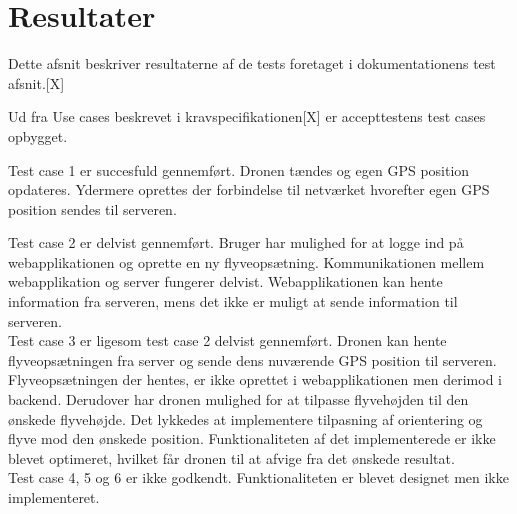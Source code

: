 \section{Resultater}

Dette afsnit beskriver resultaterne af de tests foretaget i dokumentationens test afsnit.[X]

Ud fra Use cases beskrevet i kravspecifikationen[X] er accepttestens test cases opbygget.

Test case 1 er succesfuld gennemført. Dronen tændes og egen GPS position opdateres. Ydermere oprettes der forbindelse til netværket hvorefter egen GPS position sendes til serveren.

Test case 2 er delvist gennemført. Bruger har mulighed for at logge ind på webapplikationen og oprette en ny flyveopsætning. Kommunikationen mellem webapplikation og server fungerer delvist. Webapplikationen kan hente information fra serveren, mens det ikke er muligt at sende information til serveren. \\

Test case 3 er ligesom test case 2 delvist gennemført. Dronen kan hente flyveopsætningen fra server og sende dens nuværende GPS position til serveren. Flyveopsætningen der hentes, er ikke oprettet i webapplikationen men derimod i backend. Derudover har dronen mulighed for at tilpasse flyvehøjden til den ønskede flyvehøjde. 
Det lykkedes at implementere tilpasning af orientering og flyve mod den ønskede position. Funktionaliteten af det implementerede er ikke blevet optimeret, hvilket får dronen til at afvige fra det ønskede resultat.\\

Test case 4, 5 og 6 er ikke godkendt. Funktionaliteten er blevet designet men ikke implementeret.